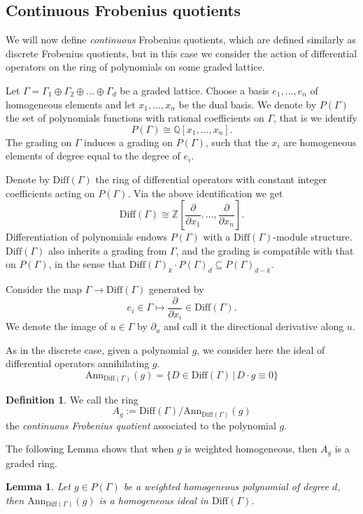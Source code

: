 \documentclass[oneside]{amsart}
\theoremstyle{plain}
\newtheorem{lemma}[theorem]{Lemma}
\theoremstyle{definition}
\newtheorem{definition}[theorem]{Definition}
\newcommand{\Z}{{\mathbb{Z}}}
\newcommand{\Q}{{\mathbb{Q}}}
\newcommand{\Ann}{{\mathrm{Ann}}}
\newcommand{\Diff}{{\mathrm{Diff}}}
\begin{document}
\subsection{Continuous Frobenius quotients}

We will now define \emph{continuous} Frobenius quotients, which are defined similarly as discrete Frobenius quotients, but in this case we consider the action of differential operators on the ring of polynomials on some graded lattice.

Let $\Gamma = \Gamma_1 \oplus \Gamma_2 \oplus \dots \oplus \Gamma_d$ be a graded lattice. Choose a basis $e_1, \dots, e_n$ of homogeneous elements
and let $x_1, \dots, x_n$ be the dual basis.
We denote by $P(\Gamma)$ the set of polynomials functions with rational coefficients on $\Gamma$, that is we identify
\[P(\Gamma) \cong \Q[x_1, \dots, x_n].\]
The grading on $\Gamma$ induces a grading on $P(\Gamma)$, such that the $x_i$ are homogeneous elements of degree equal to the degree of $e_i$.

Denote by $\Diff(\Gamma)$ the ring of differential operators with constant integer coefficients acting on $P(\Gamma)$. Via the above identification we get
\[
    \Diff(\Gamma) \cong \Z\left[\frac{\partial}{\partial x_1},\ldots,\frac{\partial}{\partial x_n}\right].
\]
Differentiation of polynomials endows $P(\Gamma)$ with a
$\Diff(\Gamma)$-module structure. $\Diff(\Gamma)$ also inherits a grading from $\Gamma$, and the grading is compatible with that on $P(\Gamma)$, in the sense that $\Diff(\Gamma)_k \cdot P(\Gamma)_d \subseteq P(\Gamma)_{d-k}$.

Consider the map $\Gamma \to \Diff(\Gamma)$ generated by
\[e_i \in \Gamma \mapsto \frac{\partial}{\partial x_i} \in \Diff(\Gamma).\]
We denote the image of $u\in \Gamma$ by $\partial_u$ and call it the directional derivative along $u$.

As in the discrete case, given a polynomial $g$, we consider here the ideal of differential operators annihilating $g$.
\[
\Ann_{\Diff(\Gamma)}(g) = \{D\in \Diff(\Gamma) \,|\, D\cdot g \equiv 0\}
\]

\begin{definition}
We call the ring
\[A_g := \Diff(\Gamma)/\Ann_{\Diff(\Gamma)}(g)\]
the \emph{continuous Frobenius quotient} associated to the polynomial $g$.
\end{definition}

The following Lemma shows that when $g$ is weighted homogeneous, then $A_g$ is a graded ring.

\begin{lemma}\label{lem:lambda-homogeneous}
    Let $g\in P(\Gamma)$ be a weighted homogeneous polynomial of degree $d$, then $\Ann_{\Diff(\Gamma)}(g)$
    is a homogeneous ideal in $\Diff(\Gamma)$.
\end{lemma}
\end{document}
